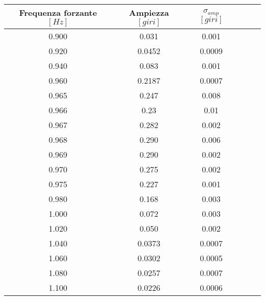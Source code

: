 \begin{tabular}{cccccc}
\toprule
Frequenza forzante $[Hz]$ & Ampiezza $[giri]$ & $\sigma_{amp}$ $[giri]$\\ \midrule
0.900 & 0.031 & 0.001\\ \midrule
0.920 & 0.0452 & 0.0009\\ \midrule
0.940 & 0.083 & 0.001\\ \midrule
0.960 & 0.2187 & 0.0007\\ \midrule
0.965 & 0.247 & 0.008\\ \midrule
0.966 & 0.23 & 0.01\\ \midrule
0.967 & 0.282 & 0.002\\ \midrule
0.968 & 0.290 & 0.006\\ \midrule
0.969 & 0.290 & 0.002\\ \midrule
0.970 & 0.275 & 0.002\\ \midrule
0.975 & 0.227 & 0.001\\ \midrule
0.980 & 0.168 & 0.003\\ \midrule
1.000 & 0.072 & 0.003\\ \midrule
1.020 & 0.050 & 0.002\\ \midrule
1.040 & 0.0373 & 0.0007\\ \midrule
1.060 & 0.0302 & 0.0005\\ \midrule
1.080 & 0.0257 & 0.0007\\ \midrule
1.100 & 0.0226 & 0.0006\\ \bottomrule
\end{tabular}
